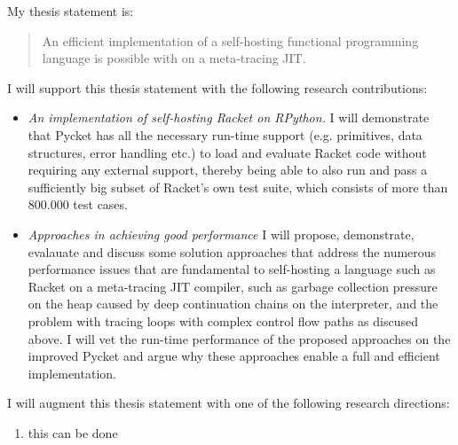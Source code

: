 My thesis statement is:

\begin{quote}
  An efficient implementation of a self-hosting functional programming
  language is possible with on a meta-tracing JIT.
\end{quote}

I will support this thesis statement with the following research
contributions:

\begin{itemize}
  \item \textit{An implementation of self-hosting Racket on RPython.}
    I will demonstrate that Pycket has all the necessary run-time
    support (e.g. primitives, data structures, error handling etc.)
    to load and evaluate Racket code without requiring any external
    support, thereby being able to also run and pass a sufficiently
    big subset of Racket's own test suite, which consists of more than
    800.000 test cases.
  \item \textit{Approaches in achieving good performance} I will
    propose, demonstrate, evalauate and discuss some solution
    approaches that address the numerous performance issues that are
    fundamental to self-hosting a language such as Racket on a
    meta-tracing JIT compiler, such as garbage collection pressure on
    the heap caused by deep continuation chains on the interpreter,
    and the problem with tracing loops with complex control flow paths
    as discused above. I will vet the run-time performance of the
    proposed approaches on the improved Pycket and argue why these
    approaches enable a full and efficient implementation.



\end{itemize}

I will augment this thesis statement with one of the following research directions:

\begin{enumerate}
  \item this can be done
\end{enumerate}
